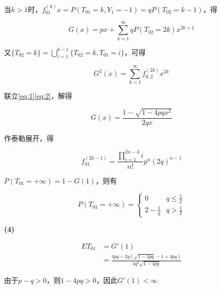 \documentclass{../notes}
\begin{document}
当$k>1$时，$f_{01}^{(k)}x = P(T_{01}=k, Y_{1}=-1) = qP(T_{02} = k-1)$，得

\begin{equation}
    G(x) = px + \sum_{k=1}^\infty qP(T_{02}=2k)x^{2k+1}
    \label{eq:1}
\end{equation}

又$\{T_{02}=k\} = \bigcup_{i=1}^{k-1}\{T_{02} = k, T_{01} = i\}$，可得

\begin{equation}
    G^2(x) = \sum_{k=1}^\infty f_{0, 2}^{(2k)}x^{2k}
    \label{eq:2}
\end{equation}

联立\eqref{eq:1}\eqref{eq:2}，解得

\begin{equation}
    G(x) = \frac{1-\sqrt{1-4pqx^2}}{2qx}
\end{equation}

作泰勒展开，得

\begin{equation}
    f_{01}^{(2k-1)} = \frac{\prod _{i=1}^{2n-3} i}{n!}p^n(2q)^{n-1}
\end{equation}

$P(T_{01} = +\infty) = 1-G(1)$，则有

\begin{equation}
    P(T_{01} = +\infty) = \begin{cases}
        0 & q\leq \frac{1}{2} \\
        2 - \frac{1}{q} & q > \frac{1}{2}
    \end{cases}
\end{equation}

\textbf{(4)}

\begin{equation}
    \begin{aligned}
        ET_{01} &= G'(1) \\
        &= \frac{4pq - 2q\left(\sqrt{1 - 4pq} - 1 + 4pq\right)}{4q^2\sqrt{1 - 4pq}}
    \end{aligned}
\end{equation}

由于$p - q > 0$，则$1 - 4pq > 0$，因此$G'(1) < \infty$
\end{document}
